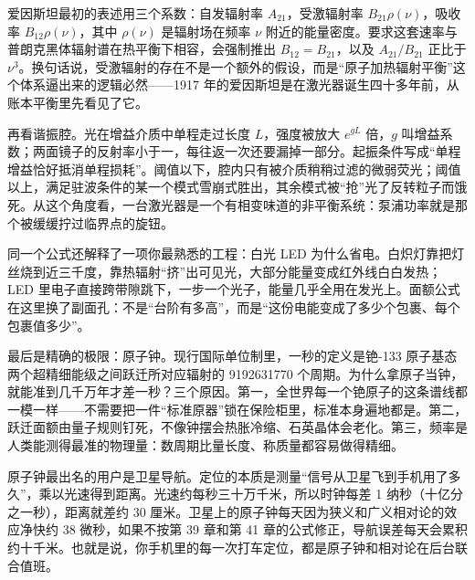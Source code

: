 \begin{challenge}
爱因斯坦最初的表述用三个系数：自发辐射率 \(A_{21}\)，受激辐射率 \(B_{21}\rho(\nu)\)，吸收率 \(B_{12}\rho(\nu)\)，其中 \(\rho(\nu)\) 是辐射场在频率 \(\nu\) 附近的能量密度。要求这套速率与普朗克黑体辐射谱在热平衡下相容，会强制推出 \(B_{12}=B_{21}\)，以及 \(A_{21}/B_{21}\) 正比于 \(\nu^{3}\)。换句话说，受激辐射的存在不是一个额外的假设，而是“原子加热辐射平衡”这个体系逼出来的逻辑必然——1917 年的爱因斯坦是在激光器诞生四十多年前，从账本平衡里先看见了它。

再看谐振腔。光在增益介质中单程走过长度 \(L\)，强度被放大 \(e^{gL}\) 倍，\(g\) 叫增益系数；两面镜子的反射率小于一，每往返一次还要漏掉一部分。起振条件写成“单程增益恰好抵消单程损耗”。阈值以下，腔内只有被介质稍稍过滤的微弱荧光；阈值以上，满足驻波条件的某一个模式雪崩式胜出，其余模式被“抢”光了反转粒子而饿死。从这个角度看，一台激光器是一个有相变味道的非平衡系统：泵浦功率就是那个被缓缓拧过临界点的旋钮。
\end{challenge}

\begin{mainline}
同一个公式还解释了一项你最熟悉的工程：白光 LED 为什么省电。白炽灯靠把灯丝烧到近三千度，靠热辐射“挤”出可见光，大部分能量变成红外线白白发热；LED 里电子直接跨带隙跳下，一步一个光子，能量几乎全用在发光上。面额公式在这里换了副面孔：不是“台阶有多高”，而是“这份电能变成了多少个包裹、每个包裹值多少”。

最后是精确的极限：原子钟。现行国际单位制里，一秒的定义是铯-133 原子基态两个超精细能级之间跃迁所对应辐射的 9192631770 个周期。为什么拿原子当钟，就能准到几千万年才差一秒？三个原因。第一，全世界每一个铯原子的这条谱线都一模一样——不需要把一件“标准原器”锁在保险柜里，标准本身遍地都是。第二，跃迁面额由量子规则钉死，不像钟摆会热胀冷缩、石英晶体会老化。第三，频率是人类能测得最准的物理量：数周期比量长度、称质量都容易做得精细。

原子钟最出名的用户是卫星导航。定位的本质是测量“信号从卫星飞到手机用了多久”，乘以光速得到距离。光速约每秒三十万千米，所以时钟每差 1 纳秒（十亿分之一秒），距离就差约 30 厘米。卫星上的原子钟每天因为狭义和广义相对论的效应净快约 38 微秒，如果不按第 39 章和第 41 章的公式修正，导航误差每天会累积约十千米。也就是说，你手机里的每一次打车定位，都是原子钟和相对论在后台联合值班。
\end{mainline}


